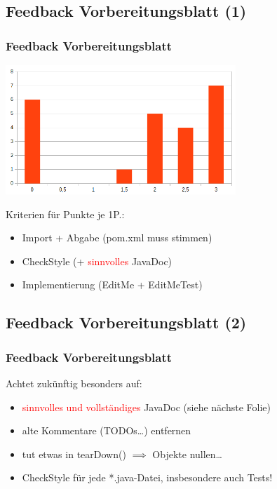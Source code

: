 \documentclass[18pt]{beamer}
\begin{document}
	\subsection{Feedback Vorbereitungsblatt (1)}	
	\begin{frame}
		\frametitle{Feedback Vorbereitungsblatt}
		\includegraphics[width=0.65\textwidth, scale=0.8]{./pics/tut0/points-prep-sheet.png}
		\begin{block}{Kriterien für Punkte}
			je 1P.:
			\begin{itemize}
				\item Import + Abgabe (pom.xml muss stimmen)
				\item CheckStyle (+ \textcolor{red}{sinnvolles} JavaDoc)
				\item Implementierung (EditMe + EditMeTest)
			\end{itemize}
		\end{block}
	\end{frame}
	
	\subsection{Feedback Vorbereitungsblatt (2)}
	\begin{frame}
		\frametitle{Feedback Vorbereitungsblatt}
		Achtet zukünftig besonders auf:
		\begin{itemize}
			\item \textcolor{red}{sinnvolles und vollständiges} JavaDoc (siehe nächste Folie) \pause
			\item alte Kommentare (TODOs\dots) entfernen \pause
			\item tut etwas in tearDown() $\implies$ Objekte nullen\dots \pause
			\item CheckStyle für jede *.java-Datei, insbesondere auch Tests!
		\end{itemize}
	\end{frame}
	
\end{document}
